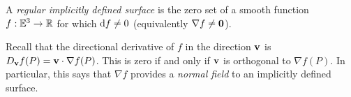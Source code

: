 

\begin{defn}{}{}
A \emph{regular implicitly defined surface} is the zero set of a smooth function $f:\mathbb{E}^3\to\mathbb{R}$ for which ${\mathrm{d} f}\neq 0$ (equivalently $\nabla f\neq \mathbf{0}$).
\end{defn}

Recall that the directional derivative of $f$ in the direction ${\mathbf{v}}$ is $D_{{\mathbf{v}}}f(P)={\mathbf{v}}\cdot\nabla f(P)$. This is zero if and only if ${\mathbf{v}}$ is orthogonal to $\nabla f(P)$. In particular, this says that $\nabla f$ provides a \emph{normal field} to an implicitly defined surface.

